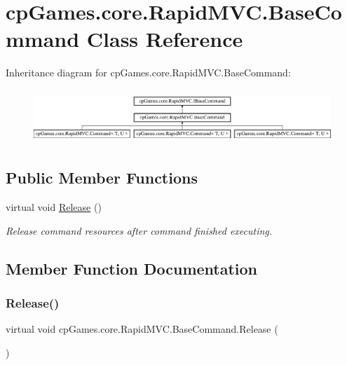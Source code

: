 \hypertarget{classcp_games_1_1core_1_1_rapid_m_v_c_1_1_base_command}{}\section{cp\+Games.\+core.\+Rapid\+M\+V\+C.\+Base\+Command Class Reference}
\label{classcp_games_1_1core_1_1_rapid_m_v_c_1_1_base_command}
Inheritance diagram for cp\+Games.\+core.\+Rapid\+M\+V\+C.\+Base\+Command\+:\begin{figure}[H]
\begin{center}
\leavevmode
\includegraphics[height=2.043796cm]{classcp_games_1_1core_1_1_rapid_m_v_c_1_1_base_command}
\end{center}
\end{figure}
\subsection*{Public Member Functions}
\begin{DoxyCompactItemize}
\item 
virtual void \mbox{\hyperlink{classcp_games_1_1core_1_1_rapid_m_v_c_1_1_base_command_afa3a355d140a2a088cfa7e5f4d71a07b}{Release}} ()
\begin{DoxyCompactList}\small\item\em Release command resources after command finished executing. \end{DoxyCompactList}\end{DoxyCompactItemize}


\subsection{Member Function Documentation}
\mbox{\label{classcp_games_1_1core_1_1_rapid_m_v_c_1_1_base_command_afa3a355d140a2a088cfa7e5f4d71a07b}} 
\subsubsection{\texorpdfstring{Release()}{Release()}}
{\footnotesize\ttfamily virtual void cp\+Games.\+core.\+Rapid\+M\+V\+C.\+Base\+Command.\+Release (\begin{DoxyParamCaption}{ }\end{DoxyParamCaption})\hspace{0.3cm}{\ttfamily [virtual]}}



